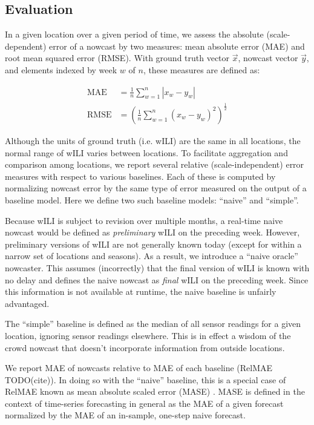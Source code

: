 \documentclass[10pt,letterpaper]{article}
\begin{document}
\subsection*{Evaluation}

In a given location over a given period of time, we assess the absolute
(scale-dependent) error of a nowcast by two measures: mean absolute error (MAE)
and root mean squared error (RMSE). With ground truth vector $\vec{x}$, nowcast
vector $\vec{y}$, and elements indexed by week $w$ of $n$, these measures are
defined as:

\begin{align*}
  \text{MAE} &= \frac{1}{n} \sum_{w=1}^n{\left|x_w - y_w\right|} \\
  \text{RMSE} &= \left( \frac{1}{n} \sum_{w=1}^n{\left(x_w - y_w\right)^2} \right)^\frac{1}{2}
\end{align*}

Although the units of ground truth (i.e. wILI) are the same in all locations,
the normal range of wILI varies between locations. To facilitate aggregation
and comparison among locations, we report several relative (scale-independent)
error measures with respect to various baselines. Each of these is computed by
normalizing nowcast error by the same type of error measured on the output of a
baseline model. Here we define two such baseline models: ``naive'' and
``simple''.

Because wILI is subject to revision over multiple months, a real-time naive
nowcast would be defined as \textit{preliminary} wILI on the preceding week.
However, preliminary versions of wILI are not generally known today (except for
within a narrow set of locations and seasons). As a result, we introduce a
``naive oracle'' nowcaster. This assumes (incorrectly) that the final version
of wILI is known with no delay and defines the naive nowcast as \textit{final}
wILI on the preceding week. Since this information is not available at runtime,
the naive baseline is unfairly advantaged.

The ``simple'' baseline is defined as the median of all sensor readings for a
given location, ignoring sensor readings elsewhere. This is in effect a wisdom
of the crowd nowcast that doesn't incorporate information from outside
locations.

We report MAE of nowcasts relative to MAE of each baseline (RelMAE TODO(cite)).
In doing so with the ``naive'' baseline, this is a special case of RelMAE known
as mean absolute scaled error (MASE) \cite{hyndman2006another}. MASE is defined
in the context of time-series forecasting in general as the MAE of a given forecast
normalized by the MAE of an in-sample, one-step naive forecast.
\end{document}
